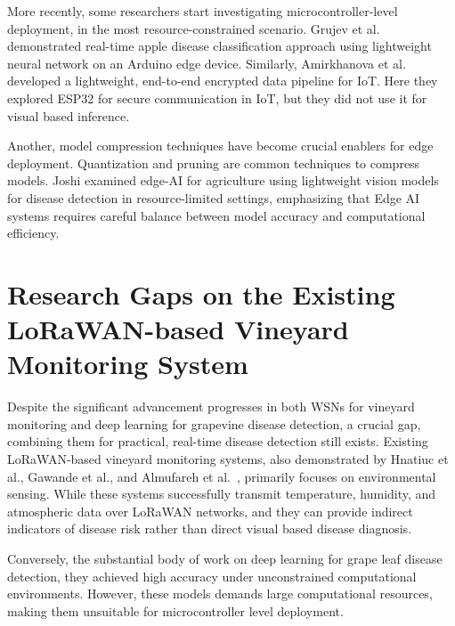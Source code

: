 More recently, some researchers start investigating microcontroller-level deployment, in the most resource-constrained scenario. Grujev et al.\cite{grujev2025efficient} demonstrated real-time apple disease classification approach using lightweight neural network on an Arduino edge device. Similarly, Amirkhanova et al.\cite{amirkhanova2026lightweight} developed a lightweight, end-to-end encrypted data pipeline for IoT. Here they explored ESP32 for secure communication in IoT, but they did not use it for visual based inference. 

Another, model compression techniques have become crucial enablers for edge deployment. Quantization and pruning are common techniques to compress models. Joshi examined edge-AI for agriculture using lightweight vision models for disease detection in resource-limited settings\cite{joshi2024edge}, emphasizing that Edge AI systems requires careful balance between model accuracy and computational efficiency.


\section{Research Gaps on the Existing LoRaWAN-based Vineyard Monitoring System}
\label{sec:precision_ag_wsn}

Despite the significant advancement progresses in both WSNs for vineyard monitoring and deep learning for grapevine disease detection, a crucial gap, combining them for practical, real-time disease detection still exists. Existing LoRaWAN-based vineyard monitoring systems, also demonstrated by Hnatiuc et al.\cite{hnatiuc2023intelligent}, Gawande et al.\cite{gawande2024early}, and Almufareh et al.~\cite{almufareh2024intelligent}, primarily focuses on environmental sensing. While these systems successfully transmit temperature, humidity, and atmospheric data over LoRaWAN networks, and they can provide indirect indicators of disease risk rather than direct visual based disease diagnosis. 


Conversely, the substantial body of work on deep learning for grape leaf disease detection\cite{karthik2024grapeleafnet, zhang2023crformer, talaat2025deepleaf}, they achieved high accuracy under unconstrained computational environments. However, these models demands large computational resources, making them unsuitable for microcontroller level deployment.


